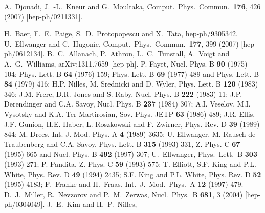 \documentclass[final,3p,times,pdflatex]{elsarticle}
\begin{document}
\begin{thebibliography}{100}
  A.~Djouadi, J.~-L.~Kneur and G.~Moultaka,
  Comput.\ Phys.\ Commun.\  {\bf 176}, 426 (2007)
  [hep-ph/0211331].

  H.~Baer, F.~E.~Paige, S.~D.~Protopopescu and X.~Tata,
  hep-ph/9305342.
  U.~Ellwanger and C.~Hugonie,
  Comput.\ Phys.\ Commun.\  {\bf 177}, 399 (2007)
  [hep-ph/0612134].
  B.~C.~Allanach, P.~Athron, L.~C.~Tunstall, A.~Voigt and A.~G.~Williams,
  arXiv:1311.7659 [hep-ph].
 P. Fayet, Nucl. Phys. B \textbf{90} (1975) 104; Phys. Lett.
B \textbf{64} (1976) 159; Phys. Lett. B \textbf{69} (1977) 489 and Phys. Lett. B
\textbf{84} (1979) 416; H.P. Nilles, M. Srednicki and D. Wyler, Phys. Lett. B
\textbf{120} (1983) 346; J.M. Frere, D.R. Jones and S. Raby, Nucl. Phys. B
\textbf{222} (1983) 11; J.P. Derendinger and C.A. Savoy, Nucl. Phys. B
\textbf{237} (1984) 307;  A.I. Veselov, M.I. Vysotsky and K.A. Ter-Martirosian,
Sov. Phys. JETP \textbf{63} (1986) 489; J.R. Ellis, J.F. Gunion, H.E. Haber, L.
Roszkowski and F. Zwirner, Phys. Rev. D \textbf{39}  (1989) 844; M. Drees, Int.
J. Mod. Phys. A \textbf{4}  (1989) 3635; U. Ellwanger, M. Rausch de
Traubenberg and C.A. Savoy, Phys. 
Lett. B \textbf{315} (1993) 331, Z. Phys. C {\bf 67} (1995) 665 and Nucl. Phys.
B \textbf{492} (1997) 307; U.~Ellwanger, Phys.\ Lett.\  B {\bf 303} (1993) 271; P.
Pandita, Z. Phys. C \textbf{59} (1993) 575; T. Elliott, S.F. King and P.L.
White, Phys. Rev. D {\bf 49} (1994) 2435; S.F. King and P.L. White, Phys. Rev. D
\textbf{52} (1995) 4183;  F.~Franke and H.~Fraas, Int.\ J.\ Mod.\ Phys.\  A {\bf
12} (1997) 479.   D.~J.~Miller, R.~Nevzorov and P.~M.~Zerwas,  Nucl.\ Phys.\ B {\bf 681}, 3 (2004) [hep-ph/0304049].
  J.~E.~Kim and H.~P.~Nilles,

\end{thebibliography}
\end{document}
